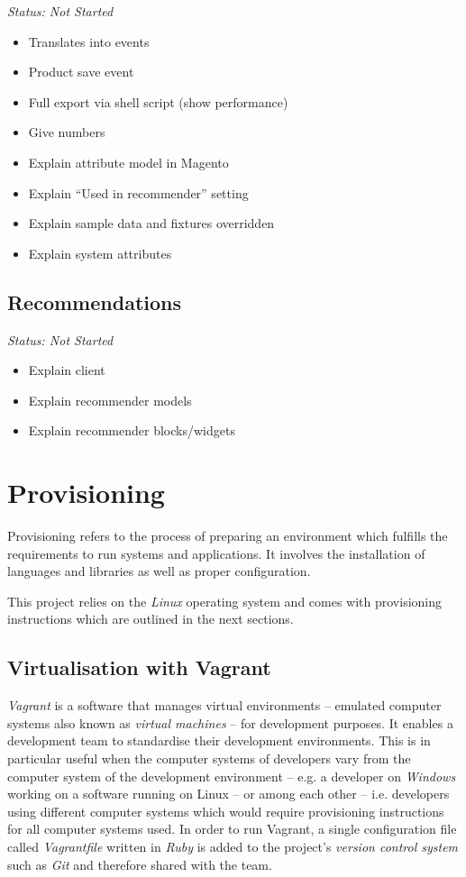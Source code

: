 \emph{Status: Not Started}

\begin{itemize}
\item Translates into events
\item Product save event
\item Full export via shell script (show performance)
\item Give numbers
\item Explain attribute model in Magento
\item Explain ``Used in recommender'' setting
\item Explain sample data and fixtures overridden
\item Explain system attributes
\end{itemize}

\subsection{Recommendations}

\emph{Status: Not Started}

\begin{itemize}
\item Explain client
\item Explain recommender models
\item Explain recommender blocks/widgets
\end{itemize}

\section{Provisioning}

Provisioning refers to the process of preparing an environment which fulfills the requirements to run systems and applications. It involves the installation of languages and libraries as well as proper configuration.

This project relies on the \emph{Linux} operating system and comes with provisioning instructions which are outlined in the next sections.

\subsection{Virtualisation with Vagrant}

\emph{Vagrant} is a software that manages virtual environments -- emulated computer systems also known as \emph{virtual machines} -- for development purposes. It enables a development team to standardise their development environments. This is in particular useful when the computer systems of developers vary from the computer system of the development environment -- e.g. a developer on \emph{Windows} working on a software running on Linux -- or among each other -- i.e. developers using different computer systems which would require provisioning instructions for all computer systems used. In order to run Vagrant, a single configuration file called \emph{Vagrantfile} written in \emph{Ruby} is added to the project's \emph{version control system} such as \emph{Git} and therefore shared with the team.

